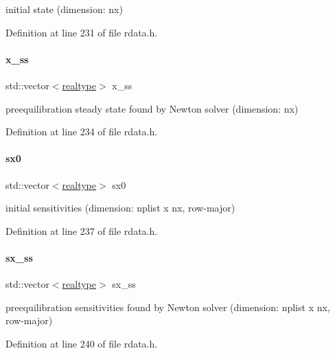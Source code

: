 initial state (dimension\+: nx) 

Definition at line 231 of file rdata.\+h.

\mbox{\label{classamici_1_1_return_data_a0507393d3010570a9740eb50287f83eb}} 
\paragraph{\texorpdfstring{x\_ss}{x\_ss}}
{\footnotesize\ttfamily std\+::vector$<$\mbox{\hyperlink{namespaceamici_a1bdce28051d6a53868f7ccbf5f2c14a3}{realtype}}$>$ x\+\_\+ss}

preequilibration steady state found by Newton solver (dimension\+: nx) 

Definition at line 234 of file rdata.\+h.

\mbox{\label{classamici_1_1_return_data_a83cf74df5a7fee8ee66f882b898e7b63}} 
\paragraph{\texorpdfstring{sx0}{sx0}}
{\footnotesize\ttfamily std\+::vector$<$\mbox{\hyperlink{namespaceamici_a1bdce28051d6a53868f7ccbf5f2c14a3}{realtype}}$>$ sx0}

initial sensitivities (dimension\+: nplist x nx, row-\/major) 

Definition at line 237 of file rdata.\+h.

\mbox{\label{classamici_1_1_return_data_abcaaf6873a0e07199325e7be9da29ec7}} 
\paragraph{\texorpdfstring{sx\_ss}{sx\_ss}}
{\footnotesize\ttfamily std\+::vector$<$\mbox{\hyperlink{namespaceamici_a1bdce28051d6a53868f7ccbf5f2c14a3}{realtype}}$>$ sx\+\_\+ss}

preequilibration sensitivities found by Newton solver (dimension\+: nplist x nx, row-\/major) 

Definition at line 240 of file rdata.\+h.

